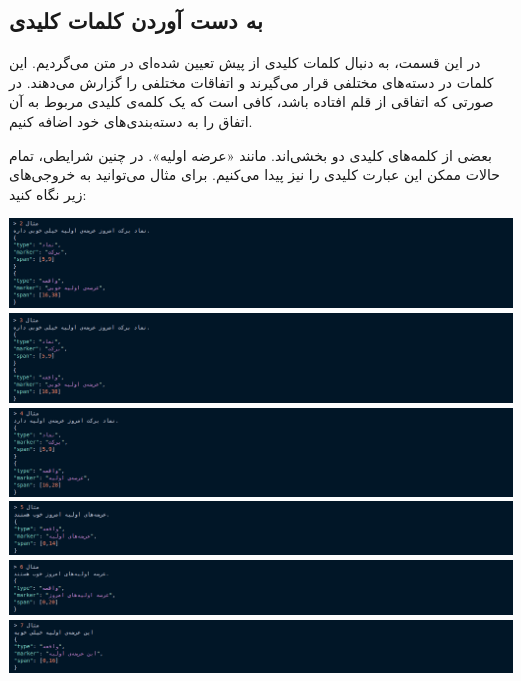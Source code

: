 \documentclass[a4paper,12pt]{article}
\begin{document}
\subsection*{به دست آوردن کلمات کلیدی}

در این قسمت، به دنبال کلمات کلیدی از پیش تعیین شده‌ای در متن می‌گردیم. این کلمات در 
دسته‌های مختلفی قرار می‌گیرند و اتفاقات مختلفی را گزارش می‌دهند. در صورتی که اتفاقی از 
قلم افتاده باشد، کافی است که یک کلمه‌ی کلیدی مربوط به آن اتفاق را به دسته‌بندی‌های خود 
اضافه کنیم. 

بعضی از کلمه‌های کلیدی دو بخشی‌اند. مانند «عرضه اولیه». در چنین شرایطی، تمام حالات ممکن این 
عبارت کلیدی را نیز پیدا می‌کنیم. برای مثال می‌توانید به خروجی‌های زیر نگاه کنید: 

\begin{center}
	\includegraphics[scale=0.5, trim ={0 0 17cm 0}, clip]{images/IPO1.png}
	\includegraphics[scale=0.5, trim ={0 0 17cm 0}, clip]{images/IPO2.png}
	\includegraphics[scale=0.5, trim ={0 0 17cm 0}, clip]{images/IPO3.png}
	\includegraphics[scale=0.5, trim ={0 0 17cm 0}, clip]{images/IPO4.png}
	\includegraphics[scale=0.5, trim ={0 0 17cm 0}, clip]{images/IPO5.png}
	\includegraphics[scale=0.5, trim ={0 0 17cm 0}, clip]{images/IPO6.png}
\end{center}
\end{document}
